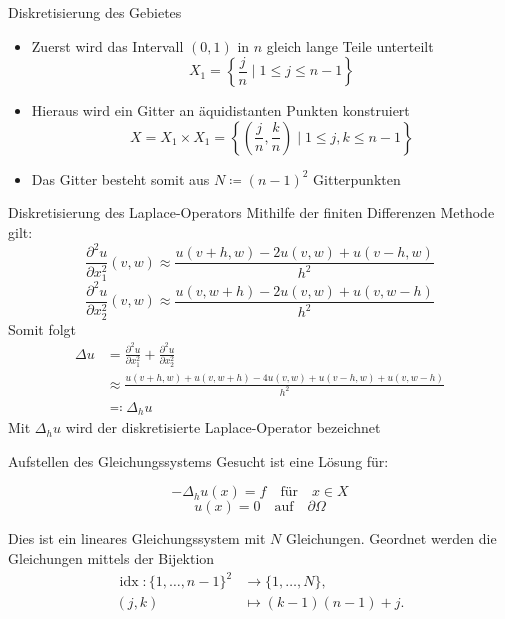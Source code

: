 \documentclass[9pt, t]{beamer}
\begin{document}
\begin{frame}{Diskretisierung des Gebietes}
\begin{itemize}
    \item 
    Zuerst wird das Intervall \((0,1)\) in \(n\) gleich lange Teile unterteilt
    \[
     X_1 = \left\{ \frac{j}{n} \mid 1 \leq j \leq n-1 \right\}
    \]
    \item 
    Hieraus wird ein Gitter an äquidistanten Punkten konstruiert
    \[
        X = X_1 \times X_1 = \left\{ \left( \frac{j}{n}, \frac{k}{n} \right) \mid 1 \leq j, k \leq n-1 \right\}
    \]
    \item 
    Das Gitter besteht somit aus \(N \coloneq(n - 1)^2\) Gitterpunkten
\end{itemize}
\end{frame}

\begin{frame}{Diskretisierung des Laplace-Operators}
Mithilfe der finiten Differenzen Methode gilt:
\[
    \frac{\partial^2 u}{\partial x_1^2} (v, w) \approx \frac{u(v + h, w) - 2u(v, w) + u(v - h, w)}{h^2}
\]
\[
    \frac{\partial^2 u}{\partial x_2^2} (v, w) \approx \frac{u(v, w + h) - 2u(v, w) + u(v, w - h)}{h^2}
\]
Somit folgt
\begin{align*}
    \Delta u & = \frac{\partial^2 u}{\partial x_1^2} + \frac{\partial^2 u}{\partial x_2^2}           \\
             & \approx \frac{u(v + h, w) + u(v, w + h) - 4u(v, w) + u(v - h, w) + u(v, w - h)}{h^2}
    \\
             & \eqcolon \Delta_h u
\end{align*}
Mit \(\Delta_h u\) wird der diskretisierte Laplace-Operator bezeichnet
\end{frame}



\begin{frame}{Aufstellen des Gleichungssystems}
 Gesucht ist eine Lösung für:

\[
    -\Delta_h u(x) = f \quad \text{für} \quad x \in X
\]
\[
    u(x) = 0 \quad \text{auf} \quad \partial \Omega
\]

Dies ist ein lineares Gleichungssystem mit \(N\) Gleichungen.
Geordnet werden die Gleichungen mittels der Bijektion
\begin{align*}
    \operatorname{idx}: \{1, \ldots, n - 1\}^2 & \longrightarrow \{1, \ldots , N\}, \\
    (j, k)                                     & \longmapsto (k - 1)(n - 1) + j.
\end{align*}


\end{frame}
\end{document}
